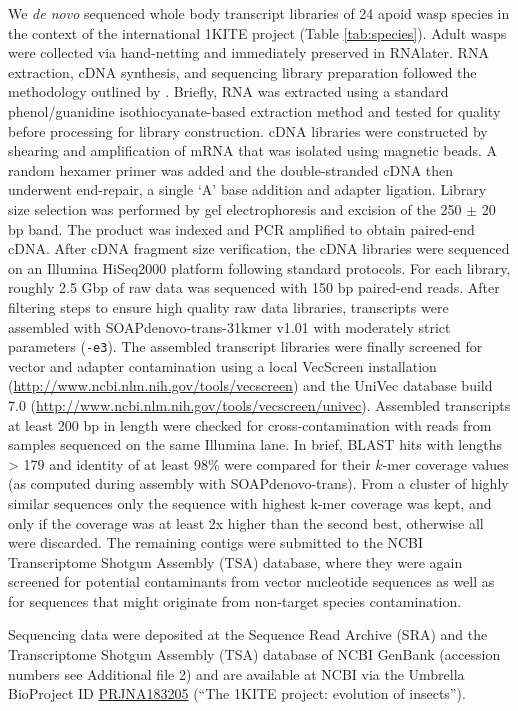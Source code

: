 We \emph{de novo} sequenced whole body transcript libraries of 24 apoid
wasp species in the context of the international 1KITE project (Table
\ref{tab:species}). Adult wasps were collected via hand-netting and immediately
preserved in RNAlater. RNA extraction, cDNA synthesis, and sequencing
library preparation followed the methodology outlined by
\citep{Misof2014}. Briefly, RNA was extracted using a standard
phenol/guanidine isothiocyanate-based extraction method and tested for
quality before processing for library construction. cDNA libraries were
constructed by shearing and amplification of mRNA that was isolated
using magnetic beads. A random hexamer primer was added and the
double-stranded cDNA then underwent end-repair, a single `A' base
addition and adapter ligation. Library size selection was performed by
gel electrophoresis and excision of the 250 $\pm$ 20 bp band. The
product was indexed and PCR amplified to obtain paired-end cDNA. After
cDNA fragment size verification, the cDNA libraries were sequenced on an
Illumina HiSeq2000 platform following standard protocols. For each
library, roughly 2.5 Gbp of raw data was sequenced with 150 bp
paired-end reads. After filtering steps to ensure high quality raw data
libraries, transcripts were assembled with SOAPdenovo-trans-31kmer v1.01
\citep{Xie2014} with moderately strict parameters (\texttt{-e3}). The
assembled transcript libraries were finally screened for vector and
adapter contamination using a local VecScreen installation
(\url{http://www.ncbi.nlm.nih.gov/tools/vecscreen}) and the UniVec
database build 7.0
(\url{http://www.ncbi.nlm.nih.gov/tools/vecscreen/univec}). Assembled
transcripts at least 200 bp in length were checked for
cross-contamination with reads from samples sequenced on the same
Illumina lane. In brief, BLAST hits with lengths \textgreater{} 179 and
identity of at least 98\% were compared for their $k$-mer coverage
values (as computed during assembly with SOAPdenovo-trans). From a
cluster of highly similar sequences only the sequence with highest k-mer
coverage was kept, and only if the coverage was at least 2x higher than
the second best, otherwise all were discarded. The remaining contigs
were submitted to the NCBI Transcriptome Shotgun Assembly (TSA)
database, where they were again screened for potential contaminants from
vector nucleotide sequences as well as for sequences that might
originate from non-target species contamination.

Sequencing data were deposited at the Sequence Read Archive (SRA) and
the Transcriptome Shotgun Assembly (TSA) database of NCBI GenBank
(accession numbers see Additional file 2) and are available at NCBI via
the Umbrella BioProject ID
\href{http://www.ncbi.nlm.nih.gov/bioproject/?term=PRJNA183205}{PRJNA183205}
(``The 1KITE project: evolution of insects'').

